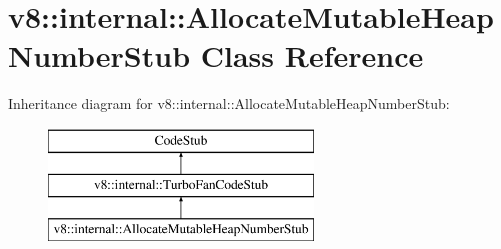 \hypertarget{classv8_1_1internal_1_1_allocate_mutable_heap_number_stub}{}\section{v8\+:\+:internal\+:\+:Allocate\+Mutable\+Heap\+Number\+Stub Class Reference}
\label{classv8_1_1internal_1_1_allocate_mutable_heap_number_stub}
Inheritance diagram for v8\+:\+:internal\+:\+:Allocate\+Mutable\+Heap\+Number\+Stub\+:\begin{figure}[H]
\begin{center}
\leavevmode
\includegraphics[height=3.000000cm]{classv8_1_1internal_1_1_allocate_mutable_heap_number_stub}
\end{center}
\end{figure}
